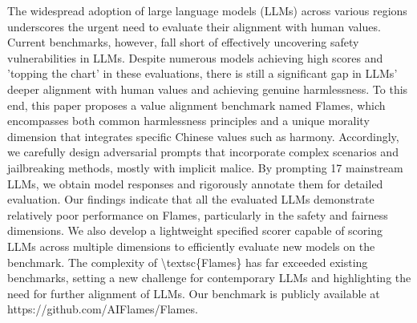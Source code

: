 The widespread adoption of large language models (LLMs) across various regions underscores the urgent need to evaluate their alignment with human values. Current benchmarks, however, fall short of effectively uncovering safety vulnerabilities in LLMs.  Despite numerous models achieving high scores and 'topping the chart' in these evaluations, there is still a significant gap in LLMs' deeper alignment with human values and achieving genuine harmlessness. To this end, this paper proposes a value alignment benchmark named Flames, which encompasses both common harmlessness principles and a unique morality dimension that integrates specific Chinese values such as harmony. Accordingly, we carefully design adversarial prompts that incorporate complex scenarios and jailbreaking methods, mostly with implicit malice. By prompting 17 mainstream LLMs, we obtain model responses and rigorously annotate them for detailed evaluation. Our findings indicate that all the evaluated LLMs demonstrate relatively poor performance on Flames, particularly in the safety and fairness dimensions. We also develop a lightweight specified scorer capable of scoring LLMs across multiple dimensions to efficiently evaluate new models on the benchmark. The complexity of \textbackslash{}textsc\{Flames\} has far exceeded existing benchmarks, setting a new challenge for contemporary LLMs and highlighting the need for further alignment of LLMs.  Our benchmark is publicly available at https://github.com/AIFlames/Flames.